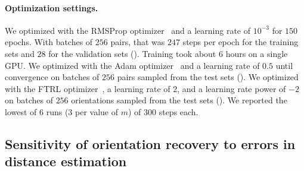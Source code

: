 \paragraph{Optimization settings.}
We optimized  with the RMSProp optimizer~\cite{tieleman2012rmsprop} and a learning rate of $10^{-3}$ for $150$ epochs.
With batches of $256$ pairs, that was $247$ steps per epoch for the training sets and $28$ for the validation sets ().
Training took about 6 hours  on a single GPU\@.
We optimized  with the Adam optimizer~\cite{kingma2014adam} and a learning rate of $0.5$ until convergence on batches of $256$ pairs sampled from the test sets ().
We optimized  with the FTRL optimizer~\cite{mcmahan2013ftrl}, a learning rate of $2$, and a learning rate power of $-2$ on batches of $256$ orientations sampled from the test sets ().
We reported the lowest of 6 runs (3 per value of $m$) of 300 steps each.



\subsection{Sensitivity of orientation recovery to errors in distance estimation}\label{sec:results:orientation-recovery:sensitivity}


